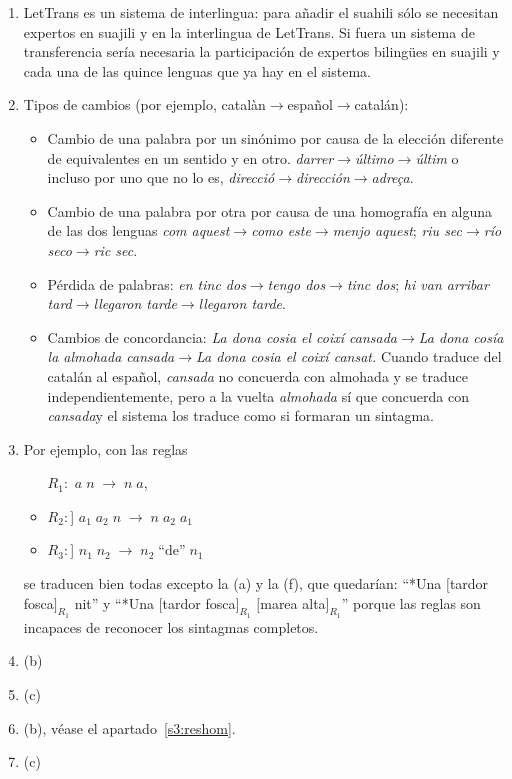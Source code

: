 \begin{enumerate}
\item LetTrans es un sistema de interlingua: para añadir el suahili sólo se necesitan expertos en suajili y en la interlingua de LetTrans. Si fuera un sistema de transferencia sería necesaria la participación de expertos bilingües en suajili y cada una de las quince lenguas que ya hay en el sistema. 

\item Tipos de cambios (por ejemplo, catalàn$\to$español$\to$catalán): \begin{itemize} \item Cambio de una palabra por un sinónimo por causa de la elección diferente de equivalentes en un sentido y en otro. \emph{darrer}$\to$\emph{último}$\to$\emph{últim} o incluso por uno que no lo es, \emph{direcció}$\to$\emph{dirección}$\to$\emph{adreça}. \item Cambio de una palabra por otra por causa de una homografía en alguna de las dos lenguas \emph{com aquest}$\to$\emph{como este}$\to$\emph{menjo aquest}; \emph{riu sec}$\to$\emph{río seco}$\to$\emph{ric sec}. \item Pérdida de palabras: \emph{ en tinc dos}$\to$\emph{tengo dos}$\to$\emph{tinc dos}; \emph{ hi van arribar tard}$\to$\emph{llegaron tarde}$\to$\emph{llegaron tarde}. 
\item Cambios de concordancia: \emph{La dona cosia el coixí cansada}$\to$\emph{La dona cosía la almohada cansada}$\to$\emph{La dona cosia el coixí cansat.} Cuando traduce del catalán al español, \emph{cansada} no concuerda con almohada y se traduce independientemente, pero a la vuelta \emph{almohada} sí que concuerda con \emph{cansada}y el sistema los traduce como si formaran un sintagma. \end{itemize} 

\item Por ejemplo, con las reglas \begin{itemize} \item[$R_1:$] $a \;n\;\to\; n\; a$, \item$R_2:$] $a_1\; a_2\;n\;\to\; n\; a_2\; a_1$ \item $R_3:$] $n_1\; n_2\;\to\; n_2\; \mbox{``de''}\; n_1$ \end{itemize} se traducen bien todas excepto la (a) y la (f), que quedarían: ``*Una $[$tardor fosca$]_{R_1}$ nit'' y ``*Una $[$tardor fosca$]_{R_1}$ $[$marea alta$]_{R_1}$'' porque las reglas son incapaces de reconocer los sintagmas completos. 

\item (b) \item (c) \item (b), véase el apartado~\ref{s3:reshom}. \item (c) 


\end{enumerate}
